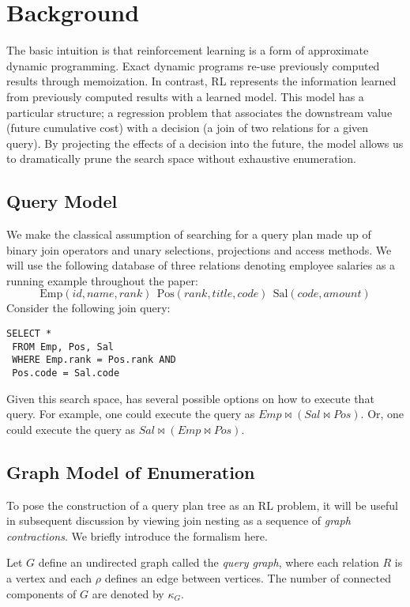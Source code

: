 \section{Background}
The basic intuition is that reinforcement learning is a form of approximate dynamic programming.
Exact dynamic programs re-use previously computed results through memoization.
In contrast, RL represents the information learned from previously computed results with a learned model.
This model has a particular structure; a regression problem that associates the downstream value (future cumulative cost) with a decision (a join of two relations for a given query).
By projecting the effects of a decision into the future, the model allows us to dramatically prune the search space without exhaustive enumeration.

\subsection{Query Model}
We make the classical assumption of searching for a query plan made up of binary join operators and unary selections, projections and access methods.
We will use the following database of three relations denoting employee salaries as a running example throughout the paper:
\[
\text{Emp}(id, name, rank)~~\text{Pos}(rank, title, code) ~~ \text{Sal}(code, amount)
\]
Consider the following join query:
\begin{lstlisting}
SELECT *
 FROM Emp, Pos, Sal
 WHERE Emp.rank = Pos.rank AND
 Pos.code = Sal.code
\end{lstlisting}
Given this search space, has several possible options on how to execute that query. For example, one could execute the query as $Emp \bowtie (Sal \bowtie Pos)$. Or, one could execute the query as $Sal \bowtie (Emp \bowtie Pos)$. 

\subsection{Graph Model of Enumeration}
To pose the construction of a query plan tree as an RL problem, it will be useful in subsequent discussion by viewing join nesting as a sequence of \emph{graph contractions}. We briefly introduce the formalism here.

\begin{definition}
Let $G$ define an undirected graph called the \emph{query graph}, where each relation $R$ is a vertex and each $\rho$ defines an edge between vertices. The number of connected components of $G$ are denoted by $\kappa_G$.
\end{definition}

